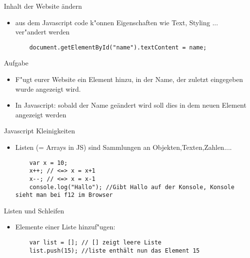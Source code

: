 \documentclass[18pt]{beamer}
\begin{document}
\begin{frame}[fragile]{Inhalt der Website ändern}
\begin{itemize}
	\item aus dem Javascript code k"onnen Eigenschaften wie Text, Styling ... ver"andert werden
	\begin{lstlisting}
	document.getElementById("name").textContent = name;
	\end{lstlisting}
\end{itemize}
\end{frame}

\begin{frame}[fragile]{Aufgabe}
\begin{itemize}
	\item F"ugt eurer Website ein Element hinzu, in der Name, der zuletzt eingegeben wurde angezeigt wird. 
	\item In Javascript: sobald der Name geändert wird soll dies in dem neuen Element angezeigt werden
\end{itemize}
\end{frame}

\begin{frame}[fragile]{Javascript Kleinigkeiten}
\begin{itemize}
	\item Listen (= Arrays in JS) sind Sammlungen an Objekten,Texten,Zahlen....
	\begin{lstlisting}
	var x = 10;
	x++; // <=> x = x+1 
	x--; // <=> x = x-1
	console.log("Hallo"); //Gibt Hallo auf der Konsole, Konsole sieht man bei f12 im Browser
	\end{lstlisting}
\end{itemize}
\end{frame}

\begin{frame}[fragile]{Listen und Schleifen}
\begin{itemize}
		\begin{lstlisting}
	var list = []; // []  leere Liste
	var list2 = [1,5,10]; // Liste aus 1,5,10
	\end{lstlisting}
	\item Elemente einer Liste hinzuf"ugen: 
		\begin{lstlisting}
	var list = []; // [] zeigt leere Liste
	list.push(15); //liste enthält nun das Element 15
	\end{lstlisting}	
\end{itemize}
\end{frame}
\end{document}
